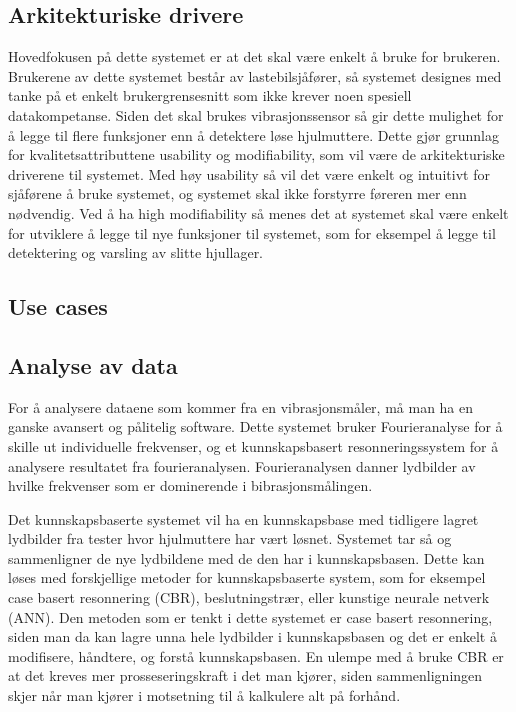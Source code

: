 \subsection{Arkitekturiske drivere}
Hovedfokusen på dette systemet er at det skal være enkelt å bruke for brukeren. 
Brukerene av dette systemet består av lastebilsjåfører, så systemet designes med tanke på et enkelt brukergrensesnitt som ikke krever noen spesiell datakompetanse. 
Siden det skal brukes vibrasjonssensor så gir dette mulighet for å legge til flere funksjoner enn å detektere løse hjulmuttere. 
Dette gjør grunnlag for kvalitetsattributtene usability og modifiability, som vil være de arkitekturiske driverene til systemet. 
Med høy usability så vil det være enkelt og intuitivt for sjåførene å bruke systemet, og systemet skal ikke forstyrre føreren mer enn nødvendig. 
Ved å ha high modifiability så menes det at systemet skal være enkelt for utviklere å legge til nye funksjoner til systemet, som for eksempel å legge til detektering og varsling av slitte hjullager.

\subsection{Use cases}


\subsection{Analyse av data}
For å analysere dataene som kommer fra en vibrasjonsmåler, må man ha en ganske avansert og pålitelig software. Dette systemet bruker Fourieranalyse \cite{Fourier} for å skille ut individuelle frekvenser, og et kunnskapsbasert resonneringssystem for å analysere resultatet fra fourieranalysen. Fourieranalysen danner lydbilder av hvilke frekvenser som er dominerende i bibrasjonsmålingen.

Det kunnskapsbaserte systemet vil ha en kunnskapsbase med tidligere lagret lydbilder fra tester hvor hjulmuttere har vært løsnet. Systemet tar så og sammenligner de nye lydbildene med de den har i kunnskapsbasen. Dette kan løses med forskjellige metoder for kunnskapsbaserte system, som for eksempel case basert resonnering (CBR), beslutningstrær, eller kunstige neurale netverk (ANN). Den metoden som er tenkt i dette systemet er case basert resonnering, siden man da kan lagre unna hele lydbilder i kunnskapsbasen og det er enkelt å modifisere, håndtere, og forstå kunnskapsbasen. En ulempe med å bruke CBR er at det kreves mer prosseseringskraft i det man kjører, siden sammenligningen skjer når man kjører i motsetning til å kalkulere alt på forhånd. 

